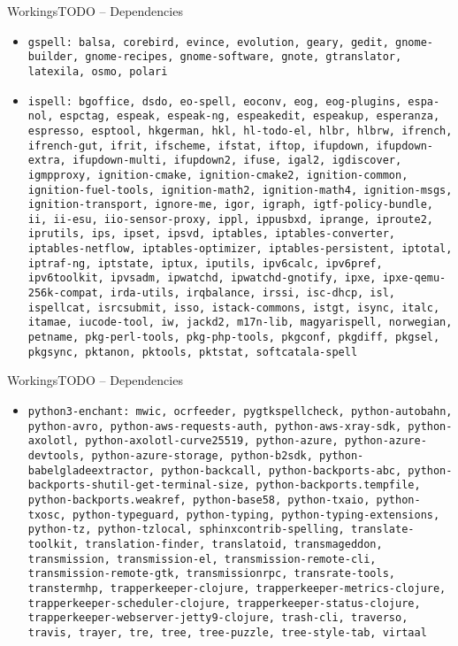 \documentclass{beamer}
\begin{document}
\begin{frame}{WorkingsTODO – Dependencies}
\begin{itemize}
\item \tiny \texttt{\alert{gspell}: balsa, corebird, evince, evolution, geary, gedit, gnome-builder, gnome-recipes, gnome-software, gnote, gtranslator, latexila, osmo, polari}
\item \tiny \texttt{\alert{ispell}: bgoffice, dsdo, eo-spell, eoconv, eog, eog-plugins, espa-nol, espctag, espeak, espeak-ng, espeakedit, espeakup, esperanza, espresso, esptool, hkgerman, hkl, hl-todo-el, hlbr, hlbrw, ifrench, ifrench-gut, ifrit, ifscheme, ifstat, iftop, ifupdown, ifupdown-extra, ifupdown-multi, ifupdown2, ifuse, igal2, igdiscover, igmpproxy, ignition-cmake, ignition-cmake2, ignition-common, ignition-fuel-tools, ignition-math2, ignition-math4, ignition-msgs, ignition-transport, ignore-me, igor, igraph, igtf-policy-bundle, ii, ii-esu, iio-sensor-proxy, ippl, ippusbxd, iprange, iproute2, iprutils, ips, ipset, ipsvd, iptables, iptables-converter, iptables-netflow, iptables-optimizer, iptables-persistent, iptotal, iptraf-ng, iptstate, iptux, iputils, ipv6calc, ipv6pref, ipv6toolkit, ipvsadm, ipwatchd, ipwatchd-gnotify, ipxe, ipxe-qemu-256k-compat, irda-utils, irqbalance, irssi, isc-dhcp, isl, ispellcat, isrcsubmit, isso, istack-commons, istgt, isync, italc, itamae, iucode-tool, iw, jackd2, m17n-lib, magyarispell, norwegian, petname, pkg-perl-tools, pkg-php-tools, pkgconf, pkgdiff, pkgsel, pkgsync, pktanon, pktools, pktstat, softcatala-spell}
\end{itemize}
\end{frame}

\begin{frame}{WorkingsTODO – Dependencies}
\begin{itemize}
\item \tiny \texttt{\alert{python3-enchant}: mwic, ocrfeeder, pygtkspellcheck, python-autobahn, python-avro, python-aws-requests-auth, python-aws-xray-sdk, python-axolotl, python-axolotl-curve25519, python-azure, python-azure-devtools, python-azure-storage, python-b2sdk, python-babelgladeextractor, python-backcall, python-backports-abc, python-backports-shutil-get-terminal-size, python-backports.tempfile, python-backports.weakref, python-base58, python-txaio, python-txosc, python-typeguard, python-typing, python-typing-extensions, python-tz, python-tzlocal, sphinxcontrib-spelling, translate-toolkit, translation-finder, translatoid, transmageddon, transmission, transmission-el, transmission-remote-cli, transmission-remote-gtk, transmissionrpc, transrate-tools, transtermhp, trapperkeeper-clojure, trapperkeeper-metrics-clojure, trapperkeeper-scheduler-clojure, trapperkeeper-status-clojure, trapperkeeper-webserver-jetty9-clojure, trash-cli, traverso, travis, trayer, tre, tree, tree-puzzle, tree-style-tab, virtaal}
\end{itemize}
\end{frame}
\end{document}
